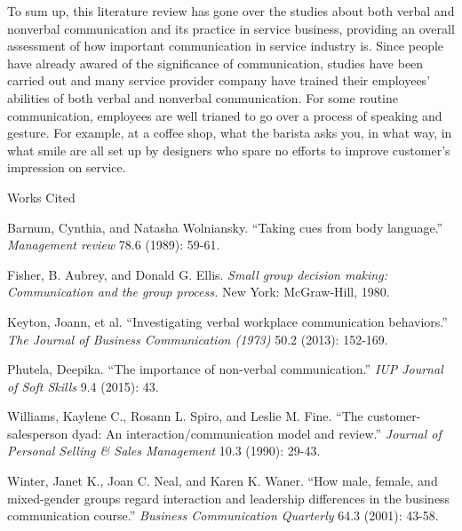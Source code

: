 \documentclass[12pt]{article}
\newcommand{\bibent}{\noindent \hangindent 40pt}
\newenvironment{workscited}{\newpage \begin{center} Works Cited \end{center}}{\newpage }
\begin{document}
\begin{flushleft}
To sum up, this literature review has gone over the studies about both verbal
and nonverbal communication and its practice in service business, providing an
overall assessment of how important communication in service industry is.
Since people have already awared of the significance of communication, studies
have been carried out and many service provider company have trained their
employees' abilities of both verbal and nonverbal communication. For some
routine communication, employees are well trianed to go over a process of
speaking and gesture. For example, at a coffee shop, what the barista asks you,
in what way, in what smile are all set up by designers who spare no efforts to
improve customer's impression on service. 
\newpage
\begin{workscited}


  
\bibent
Barnum, Cynthia, and Natasha Wolniansky. ``Taking cues from body language.'' \textit{Management review} 78.6 (1989): 59-61.

\bibent
Fisher, B. Aubrey, and Donald G. Ellis. \textit{Small group decision making: Communication and the group process.} New York: McGraw-Hill, 1980.

\bibent
Keyton, Joann, et al. ``Investigating verbal workplace communication
behaviors.'' \textit{The Journal of Business Communication (1973) } 50.2 (2013): 152-169. 

\bibent
Phutela, Deepika. ``The importance of non-verbal communication.'' \textit{IUP Journal of Soft Skills} 9.4 (2015): 43.

\bibent
Williams, Kaylene C., Rosann L. Spiro, and Leslie M. Fine. ``The customer-salesperson dyad: An interaction/communication model and review.'' \textit{Journal of Personal Selling \& Sales Management} 10.3 (1990): 29-43.

\bibent
Winter, Janet K., Joan C. Neal, and Karen K. Waner. ``How male, female, and mixed-gender groups regard interaction and leadership differences in the business communication course.''  \textit{Business Communication Quarterly} 64.3 (2001): 43-58.



\end{workscited}

\end{flushleft}
\end{document}
